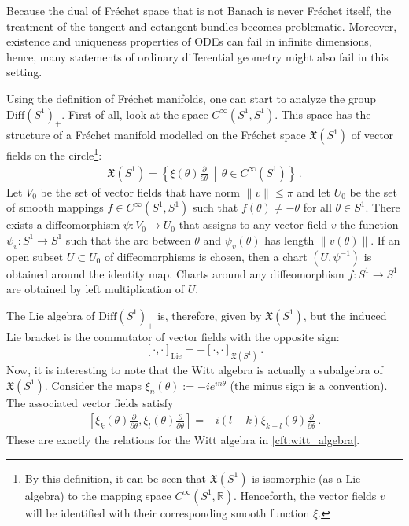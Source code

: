    \begin{remark}
        Because the dual of Fr\'echet space that is not Banach is never Fr\'echet itself, the treatment of the tangent and cotangent bundles becomes problematic. Moreover, existence and uniqueness properties of ODEs can fail in infinite dimensions, hence, many statements of ordinary differential geometry might also fail in this setting.
    \end{remark}

    Using the definition of Fr\'echet manifolds, one can start to analyze the group $\mathrm{Diff}(S^1)_+$. First of all, look at the space $C^\infty(S^1,S^1)$. This space has the structure of a Fr\'echet manifold modelled on the Fr\'echet space $\mathfrak{X}(S^1)$ of vector fields on the circle\footnote{By this definition, it can be seen that $\mathfrak{X}(S^1)$ is isomorphic (as a Lie algebra) to the mapping space $C^\infty(S^1,\mathbb{R})$. Henceforth, the vector fields $v$ will be identified with their corresponding smooth function $\xi$.}:
    \begin{gather}
        \mathfrak{X}(S^1) = \left\{\xi(\theta)\frac{\partial}{\partial\theta}\,\middle\vert\,\theta\in C^\infty(S^1)\right\}\,.
    \end{gather}
    Let $V_0$ be the set of vector fields that have norm $\|v\|\leq\pi$ and let $U_0$ be the set of smooth mappings $f\in C^\infty(S^1,S^1)$ such that $f(\theta)\neq-\theta$ for all $\theta\in S^1$. There exists a diffeomorphism $\psi:V_0\rightarrow U_0$ that assigns to any vector field $v$ the function $\psi_v:S^1\rightarrow S^1$ such that the arc between $\theta$ and $\psi_v(\theta)$ has length $\|v(\theta)\|$. If an open subset $U\subset U_0$ of diffeomorphisms is chosen, then a chart $(U,\psi^{-1})$ is obtained around the identity map. Charts around any diffeomorphism $f:S^1\rightarrow S^1$ are obtained by left multiplication of $U$.

    The Lie algebra of $\mathrm{Diff}(S^1)_+$ is, therefore, given by $\mathfrak{X}(S^1)$, but the induced Lie bracket is the commutator of vector fields with the opposite sign: \[[\cdot,\cdot]_{\text{Lie}} = -[\cdot,\cdot]_{\mathfrak{X}(S^1)}\,.\] Now, it is interesting to note that the Witt algebra is actually a subalgebra of $\mathfrak{X}(S^1)$. Consider the maps $\xi_n(\theta):=-ie^{in\theta}$ (the minus sign is a convention). The associated vector fields satisfy
    \begin{gather}
        \left[\xi_k(\theta)\frac{\partial}{\partial\theta}, \xi_l(\theta)\frac{\partial}{\partial\theta}\right] = -i(l-k)\xi_{k+l}(\theta)\frac{\partial}{\partial\theta}\,.
    \end{gather}
    These are exactly the relations for the Witt algebra in \cref{cft:witt_algebra}.

